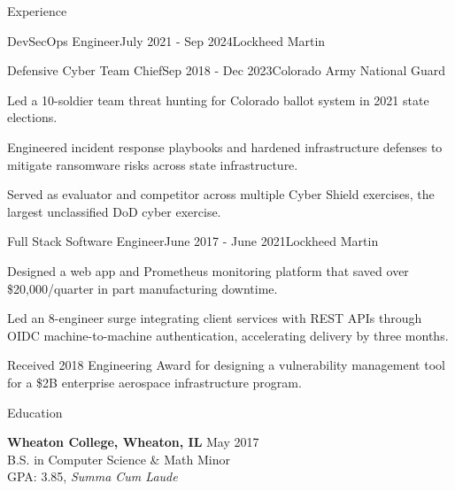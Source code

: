 \documentclass[
	a4paper, %
	10pt, %
]{resume} %
\begin{document}
\begin{rSection}{Experience}
\begin{rSubsection}{DevSecOps Engineer}{July 2021 - Sep 2024}{Lockheed Martin}
 	\end{rSubsection}
 	\begin{rSubsection}{Defensive Cyber Team Chief}{Sep 2018 - Dec 2023}{Colorado Army National Guard}
 		\item Led a 10-soldier team threat hunting for Colorado ballot system in 2021 state elections.
    \item Engineered incident response playbooks and hardened infrastructure defenses to mitigate ransomware risks across state infrastructure.
 		\item Served as evaluator and competitor across multiple Cyber Shield exercises, the largest unclassified DoD cyber exercise.
 	\end{rSubsection}
 	\begin{rSubsection}{Full Stack Software Engineer}{June 2017 - June 2021}{Lockheed Martin}
 		\item Designed a web app and Prometheus monitoring platform that saved over \$20,000/quarter in part manufacturing downtime.
 		\item Led an 8-engineer surge integrating client services with REST APIs through OIDC machine-to-machine authentication, accelerating delivery by three months.
 		\item Received 2018 Engineering Award for designing a vulnerability management tool for a \$2B enterprise aerospace infrastructure program.
  	\end{rSubsection}
 \end{rSection}

\begin{rSection}{Education}
	
	\textbf{Wheaton College, Wheaton, IL} \hfill May 2017 \\ 
	B.S. in Computer Science \& Math Minor \\
	GPA: 3.85, \textit{Summa Cum Laude}
	
\end{rSection}
\end{document}
